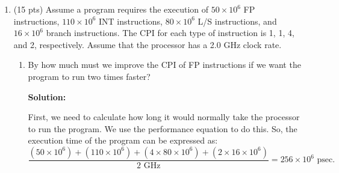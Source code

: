 \documentclass[10pt]{article} %
\begin{document}
\begin{enumerate}
\begin{enumerate} [a]
\item What is the global CPI for each implementation?

\textbf{Solution: }

For $P_1$, the global CPI can be calculated as follows:

$1 \times 0.1 + 2 \times 0.2 + 3 \times 0.5 + 3 \times 0.2 = 2.6.$

For $P_2$, the global CPI can be calculated as follows:

$2 \times 0.1 + 2 \times 0.2 + 2 \times 0.5 + 2 \times 0.2 = 2.$

\item Find the clock cycles required in both cases.

\textbf{Solution: }

For $P_1$, the time per cycle can be expressed as $\dfrac{1}{2.5} \times 10^9 = 400 \text{ psec}$.  Using this, the total execution time is 
$$ 400 \times 10^{-12} \times 10^6 \times 2.6 = 1040 \text{ seconds.} $$

For $P_2$, the time per cycle can be expressed as $\dfrac{1}{3} \times 10^9 = 333.3 \text{ psec}$.  Using this, the total execution time is 
$$ 333.3 \times 10^{-12} \times 10^6 \times 2 = 666.6 \text{ seconds.} $$

Therefore, $P_2$ is the faster processor.  

\end{enumerate}

\item 

(15 pts) Assume a program requires the execution of $50 × 10^6$ FP instructions, $110 × 10^6$ INT instructions, $80 × 10^6$ L/S instructions, and $16 × 10^6$ branch instructions. The CPI for each type of instruction is 1, 1, 4, and 2, respectively. Assume that the processor has a 2.0 GHz clock rate.
\begin{enumerate} [a]
\item By how much must we improve the CPI of FP instructions if we want the program to run two times faster?

\textbf{Solution: }

First, we need to calculate how long it would normally take the processor to run the program.  We use the performance equation to do this.  So, the execution time of the program can be expressed as:
$$ \dfrac{(50 \times 10^6) + (110 \times 10^6) + (4 \times 80 \times 10^6) + (2 \times 16 \times 10^6)}{2 \text{ GHz}} = 256 \times 10^6 \text{ psec.} $$


\end{enumerate}
\end{enumerate}
\end{document}
